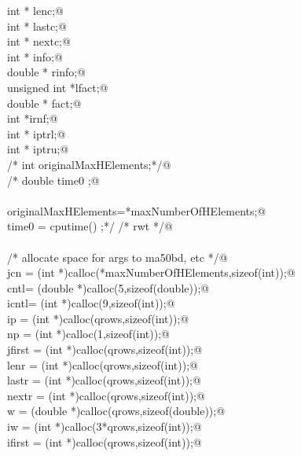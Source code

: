 \documentclass[12pt]{article}
\begin{document}
\begin{flushleft}
\begin{minipage}{\linewidth}
\begin{list}{}{}
\mbox{}\verb@        int * lenc;@\\
\mbox{}\verb@        int * lastc;@\\
\mbox{}\verb@        int * nextc;@\\
\mbox{}\verb@        int * info;@\\
\mbox{}\verb@        double * rinfo;@\\
\mbox{}\verb@        unsigned int *lfact;@\\
\mbox{}\verb@        double * fact;@\\
\mbox{}\verb@        int *irnf;@\\
\mbox{}\verb@        int * iptrl;@\\
\mbox{}\verb@        int * iptru;@\\
\mbox{}\verb@/*      int originalMaxHElements;*/@\\
\mbox{}\verb@/*      double time0 ;@\\
\mbox{}\verb@@\\
\mbox{}\verb@        originalMaxHElements=*maxNumberOfHElements;@\\
\mbox{}\verb@        time0 = cputime() ;*/ /* rwt */@\\
\mbox{}\verb@@\\
\mbox{}\verb@        /* allocate space for args to ma50bd, etc */@\\
\mbox{}\verb@        jcn = (int *)calloc(*maxNumberOfHElements,sizeof(int));@\\
\mbox{}\verb@        cntl= (double *)calloc(5,sizeof(double));@\\
\mbox{}\verb@        icntl= (int *)calloc(9,sizeof(int));@\\
\mbox{}\verb@        ip = (int *)calloc(qrows,sizeof(int));@\\
\mbox{}\verb@        np = (int *)calloc(1,sizeof(int));@\\
\mbox{}\verb@        jfirst = (int *)calloc(qrows,sizeof(int));@\\
\mbox{}\verb@        lenr = (int *)calloc(qrows,sizeof(int));@\\
\mbox{}\verb@        lastr = (int *)calloc(qrows,sizeof(int));@\\
\mbox{}\verb@        nextr = (int *)calloc(qrows,sizeof(int));@\\
\mbox{}\verb@        w = (double *)calloc(qrows,sizeof(double));@\\
\mbox{}\verb@        iw = (int *)calloc(3*qrows,sizeof(int));@\\
\mbox{}\verb@        ifirst = (int *)calloc(qrows,sizeof(int));@\\

\end{list}
\end{minipage}
\end{flushleft}
\end{document}

